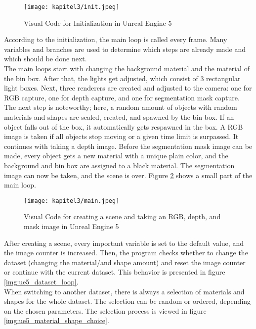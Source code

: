 		\begin{figure}[h]
			\centering
			\texttt{[image: kapitel3/init.jpeg]}
			\caption[Visual Code for Initialization in Unreal Engine 5 by Tobia Ippolito]{Visual Code for Initialization in Unreal Engine 5}
			\label{img:ue5_init}
		\end{figure}
		
		According to the initialization, the main loop is called every frame. Many variables and branches are used to determine which steps are already made and which should be done next.\\
		The main loops start with changing the background material and the material of the bin box. After that, the lights get adjusted, which consist of 3 rectangular light boxes. Next, three renderers are created and adjusted to the camera: one for RGB capture, one for depth capture, and one for segmentation mask capture. The next step is noteworthy; here, a random amount of objects with random materials and shapes are scaled, created, and spawned by the bin box. If an object falls out of the box, it automatically gets respawned in the box. A RGB image is taken if all objects stop moving or a given time limit is surpassed. It continues with taking a depth image. Before the segmentation mask image can be made, every object gets a new material with a unique plain color, and the background and bin box are assigned to a black material. The segmentation image can now be taken, and the scene is over. Figure \ref{img:ue5_main} shows a small part of the main loop.
		
		\begin{figure}[h]
			\centering
			\texttt{[image: kapitel3/main.jpeg]}
			\caption[Visual Code for creating a scene and taking an RGB, depth, and mask image in Unreal Engine 5 by Tobia Ippolito]{Visual Code for creating a scene and taking an RGB, depth, and mask image in Unreal Engine 5}
			\label{img:ue5_main}
		\end{figure}
		
		After creating a scene, every important variable is set to the default value, and the image counter is increased. Then, the program checks whether to change the dataset (changing the material/and shape amount) and reset the image counter or continue with the current dataset. This behavior is presented in figure \ref{img:ue5_dataset_loop}.\\
		When switching to another dataset, there is always a selection of materials and shapes for the whole dataset. The selection can be random or ordered, depending on the chosen parameters. The selection process is viewed in figure \ref{img:ue5_material_shape_choice}.
		
